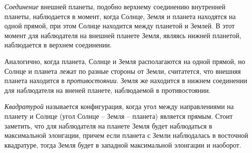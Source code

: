 {\itshape Соединение} внешней планеты, подобно верхнему 
соединению внутренней планеты, наблюдается в момент, 
когда Солнце, Земля и планета находятся на одной прямой, 
при этом Солнце находится между планетой и Землей. В 
этот момент для наблюдателя на внешней планете Земля, 
являясь нижней планетой, наблюдается в верхнем 
соединении.

Аналогично, когда планета, Солнце и Земля располагаются 
на одной прямой, но Солнце и планета лежат по разные 
стороны от Земли, считатется, что внешняя планета 
находится в {\itshape противостоянии}. Земля же находится 
в нижнем соединении для наблюдателя на вненей планете, 
наблюдаемой в противостоянии.

{\itshape Квадратурой} называется конфигурация, когда 
угол между направлениями на планету и Солнце (угол Солнце 
-- Земля -- планета) является прямым. Стоит заметить, 
что для наблюдателя на планете Земля будет наблюдаться 
в максимальной элонгации, причем если планета с Земли 
наблюдалась в восточной квадратуре, тогда Земля будет 
в западной максимальной элонгации и наоборот.
